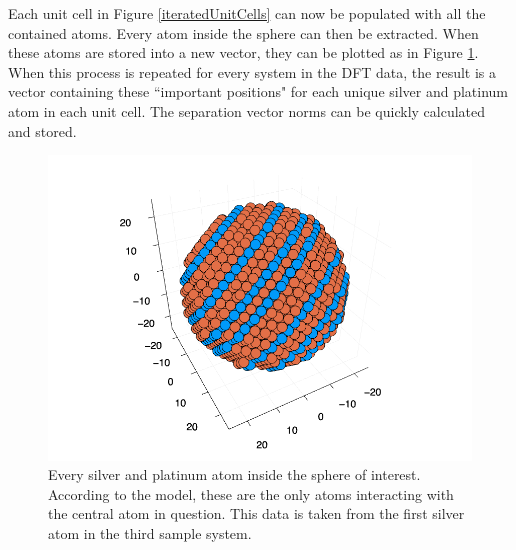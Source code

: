 Each unit cell in Figure \ref{iteratedUnitCells} can now be populated with all the contained atoms. Every atom inside the sphere can then be extracted. When these atoms are stored into a new vector, they can be plotted as in Figure \ref{plotAgAtomSphere}. When this process is repeated for every system in the DFT data, the result is a vector containing these ``important positions" for each unique silver and platinum atom in each unit cell. The separation vector norms can be quickly calculated and stored.

\begin{figure}[h]
\includegraphics[scale = 0.6]{Figures/plotAgAtomSphere(3,1)}
\caption{Every silver and platinum atom inside the sphere of interest. According to the model, these are the only atoms interacting with the central atom in question. This data is taken from the first silver atom in the third sample system. 
\label{plotAgAtomSphere}} 
\end{figure}

